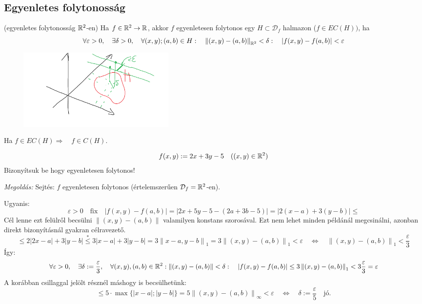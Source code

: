 \documentclass[a4paper,11.5pt]{article}
\newcommand{\norm}[1]{\left\lVert#1\right\rVert}
\begin{document}
	\subsection{Egyenletes folytonosság}
	\begin{revision}
		(egyenletes folytonosság $\mathbb{R}^2$-en) Ha $f\in\mathbb{R}^2\to\mathbb{R}$, akkor $f$ egyenletesen folytonos egy $H\subset \mathcal{D}_f$ halmazon ($f\in EC(H))$, ha
		\[ \forall\varepsilon>0,\quad \exists\delta>0,\quad \forall(x,y);(a,b)\in H:\quad \norm{(x,y)-(a,b)}_{\R^2}<\delta:\quad |f(x,y)-f(a,b)|<\varepsilon \]
		\begin{figure}[H]
			\centering
			\includegraphics[height=4cm]{../2zh/kepek/52.png}
			\caption{}
		\end{figure}
	\end{revision}
	\begin{revision}
		Ha $f\in EC(H)\Rightarrow\quad f\in C(H)$.
	\end{revision}
	\begin{task}
		\[ f(x,y):=2x+3y-5\quad ((x,y)\in\mathbb{R}^2) \]
		Bizonyítsuk be hogy egyenletesen folytonos!
		
		\textit{Megoldás:} Sejtés: $f$ egyenletesen folytonos (értelemszerűen $\mathcal{D}_f=\mathbb{R}^2$-en).
		
		Ugyanis:
		\[ \varepsilon>0\quad \text{fix}\quad |f(x,y)-f(a,b)|=|2x+5y-5-(2a+3b-5)|=|2(x-a)+3(y-b)|\leq \]
		Cél lenne ezt felülről becsülni $\norm{(x,y)-(a,b)}$ valamilyen konstans szorosával. Ezt nem lehet minden példánál megcsinálni, azonban direkt bizonyításnál gyakran célravezető.
		\[ \leq2|2x-a|+3|y-b|\overset{*}{\leq} 3|x-a|+3|y-b|=3\norm{x-a,y-b}_1=3\norm{(x,y)-(a,b)}_1<\varepsilon\quad \Leftrightarrow\quad \norm{(x,y)-(a,b)}_1<\frac{\varepsilon}{3}  \]
		Így:
		\[ \forall\varepsilon>0,\quad \exists\delta:=\frac{\varepsilon}{3},\quad \forall(x,y),(a,b)\in\R^2 : \norm{(x,y)-(a,b)}<\delta:\quad |f(x,y)-f(a,b)|\leq 3\norm{(x,y)-(a,b)}_1<3\frac{\varepsilon}{3}=\varepsilon  \]
		A korábban csillaggal jelölt résznél máshogy is becsülhetünk:
		\[ \leq 5\cdot\max\{ |x-a|;|y-b|\}=5\norm{(x,y)-(a,b)}_\infty<\varepsilon\quad \Leftrightarrow\quad \delta:=\frac{\varepsilon}{5}\quad \text{jó.} \]
		
	\end{task}
\end{document}
